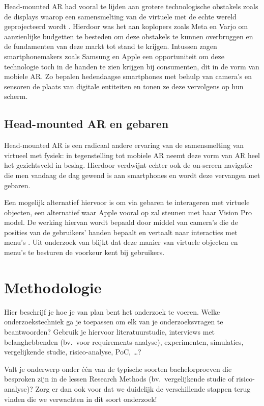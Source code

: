 Head-mounted AR had vooral te lijden aan grotere technologische obstakels zoals de displays waarop een samensmelting van de virtuele met de echte wereld geprojecteerd wordt \autocite{YunHan2018} .
Hierdoor was het aan koplopers zoals Meta en Varjo om aanzienlijke budgetten te besteden om deze obstakels te kunnen overbruggen en de fundamenten van deze markt tot stand te krijgen. %
Intussen zagen smartphonemakers zoals Samsung en Apple een opportuniteit om deze technologie toch in de handen te zien krijgen bij consumenten, dit in de vorm van mobiele AR.
Zo bepalen hedendaagse smartphones met behulp van camera's en sensoren de plaats van digitale entiteiten en tonen ze deze vervolgens op hun scherm.

\subsection{Head-mounted AR en gebaren}
\label{subsec:head-mounted-ar}
Head-mounted AR is een radicaal andere ervaring van de samensmelting van virtueel met fysiek: in tegenstelling tot mobiele AR neemt deze vorm van AR heel het gezichtsveld in beslag.
Hierdoor verdwijnt echter ook de on-screen navigatie die men vandaag de dag gewend is aan smartphones en wordt deze vervangen met gebaren.

Een mogelijk alternatief hiervoor is om via gebaren te interageren met virtuele objecten, een alternatief waar Apple vooral op zal steunen met haar Vision Pro model.
De werking hiervan wordt bepaald door middel van camera's die de posities van de gebruikers' handen bepaalt en vertaalt naar interacties met menu's \textcite{Shrestha2018} .
Uit onderzoek van \textcite{Datcu2013} blijkt dat deze manier van virtuele objecten en menu's te besturen de voorkeur kent bij gebruikers.

\section{Methodologie}%
\label{sec:methodologie}


Hier beschrijf je hoe je van plan bent het onderzoek te voeren. Welke onderzoekstechniek ga je toepassen om elk van je onderzoeksvragen te beantwoorden? Gebruik je hiervoor literatuurstudie, interviews met belanghebbenden (bv.~voor requirements-analyse), experimenten, simulaties, vergelijkende studie, risico-analyse, PoC, \ldots?

Valt je onderwerp onder één van de typische soorten bachelorproeven die besproken zijn in de lessen Research Methods (bv.\ vergelijkende studie of risico-analyse)? Zorg er dan ook voor dat we duidelijk de verschillende stappen terug vinden die we verwachten in dit soort onderzoek!

